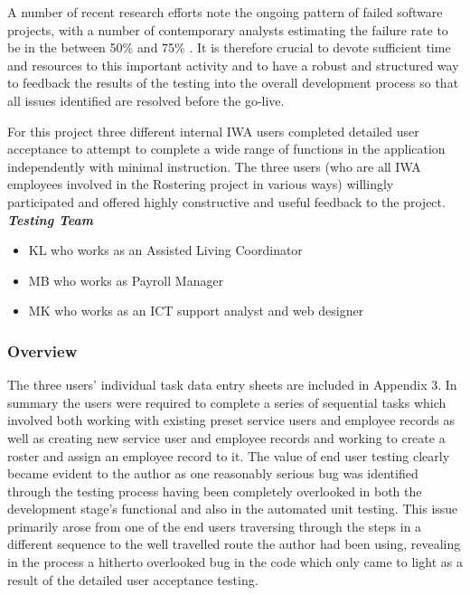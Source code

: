 \documentclass[a4paper,Times New Roman 11pt]{article}
\begin{document}
A number of recent research efforts note the ongoing pattern of failed software projects, with a number of contemporary analysts estimating the failure rate to be in the between 50\% \parencite{florentine} and 75\% \parencite{gartner}. It is therefore crucial to devote sufficient time and resources to this important activity and to have a robust and structured way to feedback the results of the testing into the overall development process so that all issues identified are resolved before the go-live.

For this project  three different internal IWA users completed detailed user acceptance to attempt to complete a wide range of functions in the application independently with minimal instruction. The three users (who are all IWA employees involved in the Rostering project in various ways) willingly participated and offered highly constructive and useful feedback to the project. 
\newline
\textit{\textbf{Testing Team}}

\begin{itemize}
\item KL who works as an Assisted Living Coordinator
\item MB who works as Payroll Manager
\item MK who works as an ICT support analyst and web designer
\end{itemize}

\subsubsection{Overview}
The three users' individual task data entry sheets are included in Appendix 3. In summary the users were required to complete a series of sequential tasks which involved both working with existing preset service users and employee records as well as creating new service user and employee records and working to create a roster and assign an employee record to it. The value of end user testing clearly became evident to the author as one reasonably serious bug was identified through the testing process having been completely overlooked in both the development stage's functional and also in the automated unit testing. This issue primarily arose from one of the end users traversing through the steps in a different sequence to the well travelled route the author had been using, revealing in the process a hitherto overlooked bug in the code which only came to light as a result of the detailed user acceptance testing.
\end{document}
